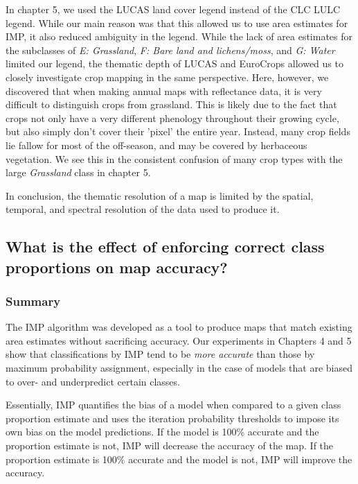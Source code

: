         In chapter 5, we used the LUCAS land cover legend instead of the CLC LULC legend. While our main reason was that this allowed us to use area estimates for IMP, it also reduced ambiguity in the legend. While the lack of area estimates for the subclasses of \textit{E: Grassland}, \textit{F: Bare land and lichens/moss}, and \textit{G: Water} limited our legend, the thematic depth of LUCAS and EuroCrops allowed us to closely investigate crop mapping in the same perspective. Here, however, we discovered that when making annual maps with reflectance data, it is very difficult to distinguish crops from grassland. This is likely due to the fact that crops not only have a very different phenology throughout their growing cycle, but also simply don't cover their 'pixel' the entire year. Instead, many crop fields lie fallow for most of the off-season, and may be covered by herbaceous vegetation. We see this in the consistent confusion of many crop types with the large \textit{Grassland} class in chapter 5.

        In conclusion, the thematic resolution of a map is limited by the spatial, temporal, and spectral resolution of the data used to produce it.
            
    \subsection{What is the effect of enforcing correct class proportions on map accuracy?}
    \label{syn:rq4}

        \subsubsection{Summary}

        The IMP algorithm was developed as a tool to produce maps that match existing area estimates without sacrificing accuracy. Our experiments in Chapters 4 and 5 show that classifications by IMP tend to be \textit{more accurate} than those by maximum probability assignment, especially in the case of models that are biased to over- and underpredict certain classes.

        Essentially, IMP quantifies the bias of a model when compared to a given class proportion estimate and uses the iteration probability thresholds to impose its own bias on the model predictions. If the model is 100\% accurate and the proportion estimate is not, IMP will decrease the accuracy of the map. If the proportion estimate is 100\% accurate and the model is not, IMP will improve the accuracy.

